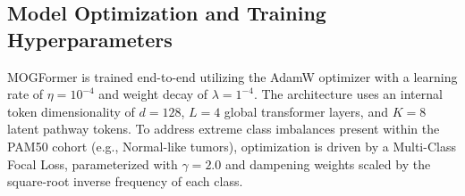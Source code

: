 \documentclass[10pt, twocolumn]{article}
\begin{document}
\subsection*{Model Optimization and Training Hyperparameters}
MOGFormer is trained end-to-end utilizing the AdamW optimizer with a learning rate of $\eta = 10^{-4}$ and weight decay of $\lambda = 1^{-4}$. The architecture uses an internal token dimensionality of $d=128$, $L=4$ global transformer layers, and $K=8$ latent pathway tokens. To address extreme class imbalances present within the PAM50 cohort (e.g., Normal-like tumors), optimization is driven by a Multi-Class Focal Loss, parameterized with $\gamma = 2.0$ and dampening weights scaled by the square-root inverse frequency of each class.


\normalsize
% 
% 
\end{document}
